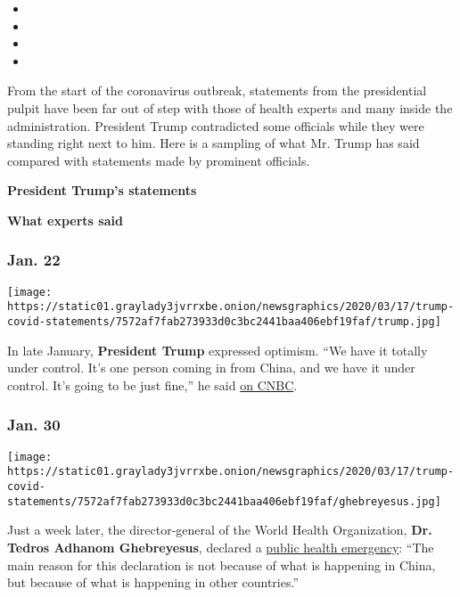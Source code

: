 \begin{itemize}
\item
\item
\item
\item
\end{itemize}

From the start of the coronavirus outbreak, statements from the
presidential pulpit have been far out of step with those of health
experts and many inside the administration. President Trump contradicted
some officials while they were standing right next to him. Here is a
sampling of what Mr. Trump has said compared with statements made by
prominent officials.

\textbf{President Trump's statements}

\textbf{What experts said}

\hypertarget{jan-22}{%
\subsubsection{Jan. 22}\label{jan-22}}

\texttt{[image: https://static01.graylady3jvrrxbe.onion/newsgraphics/2020/03/17/trump-covid-statements/7572af7fab273933d0c3bc2441baa406ebf19faf/trump.jpg]}

In late January, \textbf{President Trump} expressed optimism. ``We have
it totally under control. It's one person coming in from China, and we
have it under control. It's going to be just fine,'' he said
\href{https://www.cnbc.com/2020/01/22/cnbc-transcript-president-donald-trump-sits-down-with-cnbcs-joe-kernen-at-the-world-economic-forum-in-davos-switzerland.html}{on
CNBC}.

\hypertarget{jan-30}{%
\subsubsection{Jan. 30}\label{jan-30}}

\texttt{[image: https://static01.graylady3jvrrxbe.onion/newsgraphics/2020/03/17/trump-covid-statements/7572af7fab273933d0c3bc2441baa406ebf19faf/ghebreyesus.jpg]}

Just a week later, the director-general of the World Health
Organization, \textbf{Dr. Tedros Adhanom Ghebreyesus}, declared a
\href{https://www.who.int/dg/speeches/detail/who-director-general-s-statement-on-ihr-emergency-committee-on-novel-coronavirus-(2019-ncov)}{public
health emergency}: ``The main reason for this declaration is not because
of what is happening in China, but because of what is happening in other
countries.''

